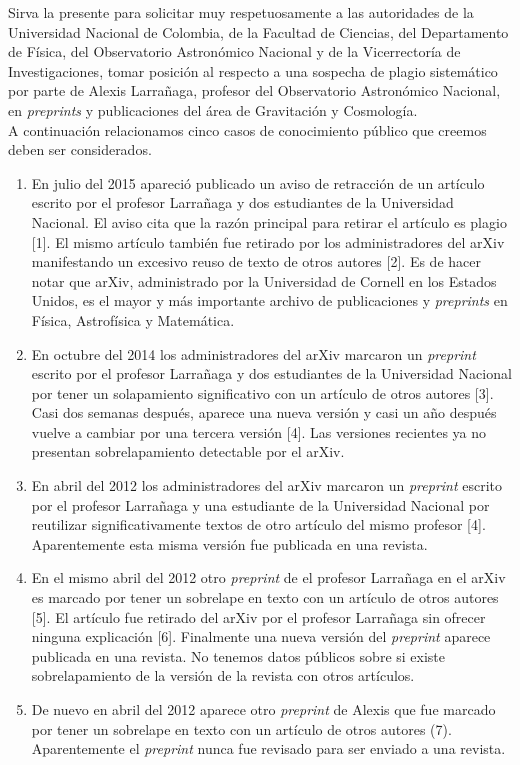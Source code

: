 \documentclass[11pt]{article}
\begin{document}
\large
Sirva la presente para solicitar muy respetuosamente a las autoridades
de la Universidad Nacional de Colombia, de la Facultad de Ciencias,
del Departamento de F\'isica, del Observatorio Astron\'omico Nacional y de
la Vicerrector\'ia de Investigaciones, tomar posici\'on al respecto a una
sospecha de plagio sistem\'atico por parte de Alexis Larra\~naga, profesor
del Observatorio Astron\'omico Nacional, en \textit{preprints} y publicaciones
del \'area de Gravitaci\'on y Cosmolog\'ia.
\\

A continuaci\'on relacionamos cinco casos de conocimiento p\'ublico
que creemos deben ser considerados.
\begin{enumerate}
\item En julio del 2015 apareci\'o publicado un aviso de retracci\'on de un
art\'iculo escrito por el profesor Larra\~naga y dos estudiantes de la Universidad
Nacional.  El aviso cita que la raz\'on principal para retirar el
art\'iculo es plagio [1]. El mismo art\'iculo tambi\'en fue retirado por los
administradores del arXiv manifestando un excesivo reuso de texto de
otros autores [2]. Es de hacer notar que arXiv, administrado por la
Universidad de Cornell en los Estados Unidos, es el mayor y m\'as
importante archivo de publicaciones y \textit{preprints} en F\'isica,
Astrof\'isica y Matem\'atica.

\item En octubre del 2014 los administradores del arXiv marcaron un
  \textit{preprint} escrito por el profesor Larra\~naga y dos estudiantes de la
  Universidad Nacional por tener un solapamiento significativo con
  un art\'iculo de otros autores [3]. Casi dos semanas despu\'es,
  aparece una nueva versi\'on y casi un a\~no despu\'es vuelve a
  cambiar por una tercera versi\'on [4]. Las versiones recientes ya
    no presentan sobrelapamiento detectable por el arXiv.

\item En abril del 2012 los administradores del arXiv marcaron un
  \textit{preprint} escrito por el profesor Larra\~naga y una estudiante
  de la Universidad Nacional por reutilizar significativamente
  textos de otro art\'iculo del mismo profesor [4]. Aparentemente esta
  misma versi\'on fue publicada en una revista.

\item En el mismo abril del 2012 otro \textit{preprint} de el profesor Larra\~naga
en el arXiv es marcado por tener un sobrelape en texto con un art\'iculo de otros
autores [5]. El art\'iculo fue retirado del arXiv por el profesor Larra\~naga
sin ofrecer ninguna explicaci\'on [6]. Finalmente una nueva versi\'on del
\textit{preprint} aparece publicada en una revista. No tenemos datos p\'ublicos
sobre si existe sobrelapamiento de la versi\'on de la revista con otros
art\'iculos.

\item De nuevo en abril del 2012 aparece otro \textit{preprint} de
  Alexis que fue marcado por tener un sobrelape en texto con un
  art\'iculo de otros autores (7). Aparentemente el \textit{preprint}
  nunca fue revisado para ser enviado a una revista.
\end{enumerate}
\end{document}
